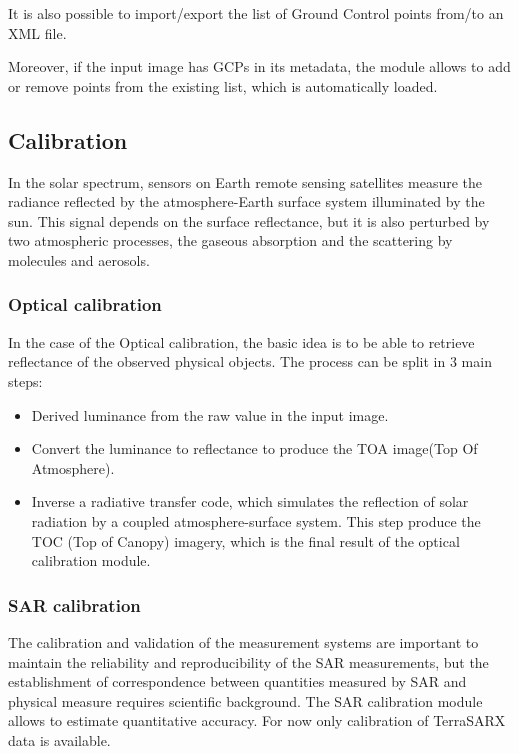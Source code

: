 It is also possible to import/export the list of Ground Control points
from/to an XML file.

Moreover, if the input image has GCPs in its metadata, the
module allows to add or remove points from the existing list, which is
automatically loaded.

\subsection{Calibration}
In the solar spectrum, sensors on Earth remote sensing satellites
measure the radiance reflected by the atmosphere-Earth surface system
illuminated by the sun. This signal depends on the surface
reflectance, but it is also perturbed by two atmospheric processes,
the gaseous absorption and the scattering by molecules and aerosols.

\subsubsection{Optical calibration}
In the case of the Optical calibration, the basic idea is to be able
to retrieve reflectance of the observed physical objects. The process can be split in 3 main steps:

\begin{itemize}
\item Derived luminance from the raw value in the input image. 
\item Convert the luminance to reflectance to produce the TOA
  image(Top Of Atmosphere).
\item Inverse a radiative transfer code, which simulates the reflection
  of solar radiation by a coupled atmosphere-surface system. This step
  produce the TOC (Top of Canopy) imagery, which is the final result of
  the optical calibration module.
\end{itemize}


\subsubsection{SAR calibration}

The calibration and validation of the measurement systems are
important to maintain the reliability and reproducibility of the SAR
measurements, but the establishment of correspondence between
quantities measured by SAR and physical measure requires
scientific background. The SAR calibration module allows to estimate
quantitative accuracy. For now only calibration of TerraSARX data is
available.

